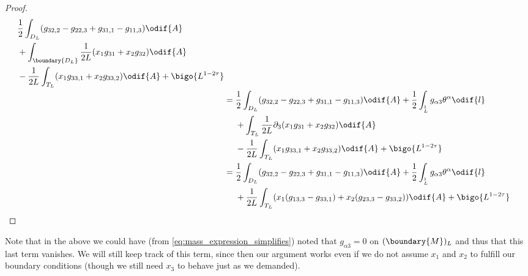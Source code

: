 \documentclass[titlepage,numbers=noenddot,oneside,%
cleardoublepage=empty,paper=a4,fontsize=11pt,%
english,%
]{scrartcl}
\let\sphere\relax
\newcommand{\sphere}{\mathbb{S}}
\begin{document}
\begin{proof}
\begin{equation*}
\begin{aligned}[t]
\begin{aligned}[t]
                &\frac{1}{2}\int_{D_L}(g_{32,2}-g_{22,3}+g_{31,1}-g_{11,3})\odif{A}\\
                &+\int_{\boundary{D_L}}\frac{1}{2L}(x_1g_{31}+x_2g_{32})\odif{A}\\
                &-\frac{1}{2L}\int_{T_L}(x_1 g_{33,1}+x_2 g_{33,2})\odif{A}+\bigo{L^{1-2\tau}}
            \end{aligned}\\
            &=\begin{aligned}[t]
                &\frac{1}{2}\int_{D_L}(g_{32,2}-g_{22,3}+g_{31,1}-g_{11,3})\odif{A}+\frac{1}{2}\int_{\sphere^1_L}g_{\alpha 3}\theta^{\alpha}\odif{l}\\
                &+\int_{T_L}\frac{1}{2L}\partial_3(x_1g_{31}+x_2g_{32})\odif{A}\\
                &-\frac{1}{2L}\int_{T_L}(x_1 g_{33,1}+x_2 g_{33,2})\odif{A}+\bigo{L^{1-2\tau}}
            \end{aligned}\\
            &=\begin{aligned}[t]
                &\frac{1}{2}\int_{D_L}(g_{32,2}-g_{22,3}+g_{31,1}-g_{11,3})\odif{A}+\frac{1}{2}\int_{\sphere^1_L}g_{\alpha 3}\theta^{\alpha}\odif{l}\\
                &+\frac{1}{2L}\int_{T_L}(x_1 (g_{13,3}-g_{33,1})+x_2 (g_{23,3}-g_{33,2}))\odif{A}+\bigo{L^{1-2\tau}}
            \end{aligned}
        \end{aligned}
    \end{equation*}
\end{proof}
Note that in the above we could have (from \cref{eq:mass_expression_simplifies}) noted that \( g_{\alpha 3}=0 \) on \( (\boundary{M})_L \) and thus that this last term vanishes. We will still keep track of this term, since then our argument works even if we do not assume \( x_1 \) and \( x_2 \) to fulfill our boundary conditions (though we still need \( x_3 \) to behave just as we demanded).
\end{document}
